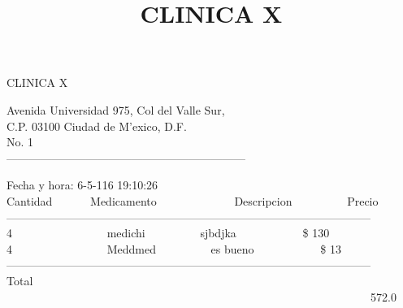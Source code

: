\documentclass[10pt,a4paper]{letter}
\title{\bf CLINICA X}
\begin{document}
\begin{center}
{\scshape\LARGE CLINICA X\par}
{Avenida Universidad 975, Col del Valle Sur,\\}
{C.P. 03100 Ciudad de M'exico, D.F.}\\ 
{No. 1}\\ 
---------------------------------------------------------------
\end{center}

Fecha y hora: 6-5-116 19:10:26\\

Cantidad \ \ \ \ \ \ Medicamento \ \ \ \ \ \ \ \ \ \ \ \ \  Descripcion  \ \ \ \ \ \ \ \ \ Precio \\
------------------------------------------------------------------------------------------------ \\
4 \ \ \ \ \ \ \ \ \ \ \ \ \ \ \ \ medichi \ \ \ \ \ \ \ \ \ sjbdjka \ \ \ \ \ \ \ \ \ \ \ \$ 130 \\
4 \ \ \ \ \ \ \ \ \ \ \ \ \ \ \ \ Meddmed \ \ \ \ \ \ \ \ \ es bueno \ \ \ \ \ \ \ \ \ \ \ \$ 13 \\

------------------------------------------------------------------------------------------------ \\
Total	\ \ \ \ \ \ \ \ \ \ \ \ \  \ \ \ \ \ \ \ \ \ \ \ \ \ \ \ \ \ \ \ \ \ \ \ \ \ \ \ \ \ \ \ \ \ \ \ \ \ \ \ \ \  \ \ \ \ \ \ \ \ \ \ 572.0 \\
 
\end{document}

